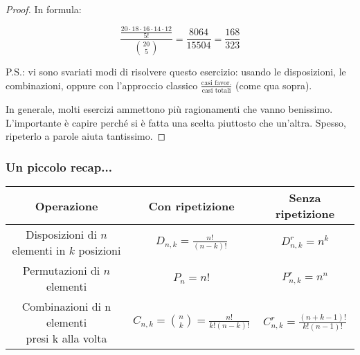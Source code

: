 \documentclass[handout]{beamer}
\begin{document}
\begin{frame}

    \begin{proof}
	
	In formula:
	
	\[
		\frac{\frac{20 \cdot 18 \cdot 16 \cdot 14 \cdot 12}{5!}}{\binom{20}{5}} =  \frac{8064}{15504} = \frac{168}{323}
	\]
	
	\medskip
	P.S.: vi sono svariati modi di risolvere questo esercizio: usando le disposizioni, le combinazioni, oppure con l'approccio classico $ \frac{\text{casi favor.}}{\text{casi totali}}$ (come qua sopra).
	
	In generale, molti esercizi ammettono più ragionamenti che vanno benissimo. L'importante è capire perché si è fatta una scelta piuttosto che un'altra. Spesso, ripeterlo a parole aiuta tantissimo.
\end{proof}

\end{frame}

\begin{frame}[fragile]
    \frametitle{Un piccolo recap...}
    
    \begin{tabular}{|ccc|}
    \hline
    Operazione & Con ripetizione & Senza ripetizione \\ \hline
    \makecell{Disposizioni di\\$n$ elementi\\in $k$ posizioni} & $D_{n,k} = \frac{n!}{(n-k)!}$ & $D^r_{n,k} = n^k$ \\ 
    Permutazioni di $n$ elementi &  $P_n = n!$ & $P^r_{n,k} = n^n$ \\
    \makecell{Combinazioni di n elementi\\presi k alla volta} & $C_{n,k} = \binom{n}{k} = \frac{n!}{k!(n-k)!}$ & $C^r_{n,k} = \frac{(n+k-1)!}{k!(n-1)!}$ \\ \hline
    \end{tabular}

    
\end{frame}

\end{document}
